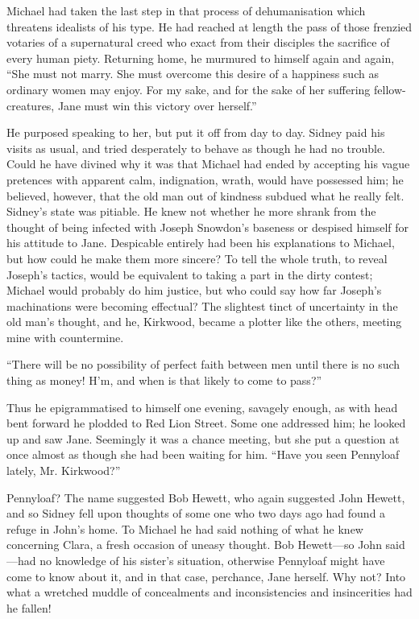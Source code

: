 Michael had taken the last step in that process of dehumanisation which
threatens idealists of his type. He had reached at length the pass of
those frenzied votaries of a supernatural creed who exact from their
disciples the sacrifice of every human piety. Returning home, he
murmured to himself again and again, ``She must not marry. She must
overcome this desire of a happiness such as ordinary women may enjoy.
For my sake, and for the sake of her suffering fellow-creatures, Jane
must win this victory over herself.''

He purposed speaking to her, but put it off from day to day. Sidney paid
his visits as usual, and tried desperately to behave as though he had no
trouble. Could he have divined why it was that Michael had ended by
accepting his vague pretences with apparent calm, indignation, wrath,
would have possessed him; he believed, however, that the old man out of
kindness subdued what he really felt. Sidney's state was pitiable. He
knew not whether {\protect\hypertarget{20}{}{}}he more shrank from the
thought of being infected with Joseph Snowdon's baseness or despised
himself for his attitude to Jane. Despicable entirely had been his
explanations to Michael, but how could he make them more sincere? To
tell the whole truth, to reveal Joseph's tactics, would be equivalent to
taking a part in the dirty contest; Michael would probably do him
justice, but who could say how far Joseph's machinations were becoming
effectual? The slightest tinct of uncertainty in the old man's thought,
and he, Kirkwood, became a plotter like the others, meeting mine with
countermine.

``There will be no possibility of perfect faith between men until there
is no such thing as money! H'm, and when is that likely to come to
pass?''

Thus he epigrammatised to himself one evening, savagely enough, as with
head bent forward he plodded to Red Lion Street. Some one addressed him;
he looked up and saw Jane. Seemingly it was a chance meeting, but she
put a question at once almost as though she had been waiting for him.
``Have you seen Pennyloaf lately, Mr. Kirkwood?''

{\protect\hypertarget{21}{}{}}Pennyloaf? The name suggested Bob Hewett,
who again suggested John Hewett, and so Sidney fell upon thoughts of
some one who two days ago had found a refuge in John's home. To Michael
he had said nothing of what he knew concerning Clara, a fresh occasion
of uneasy thought. Bob Hewett---so John said---had no knowledge of his
sister's situation, otherwise Pennyloaf might have come to know about
it, and in that case, perchance, Jane herself. Why not? Into what a
wretched muddle of concealments and inconsistencies and insincerities
had he fallen!

